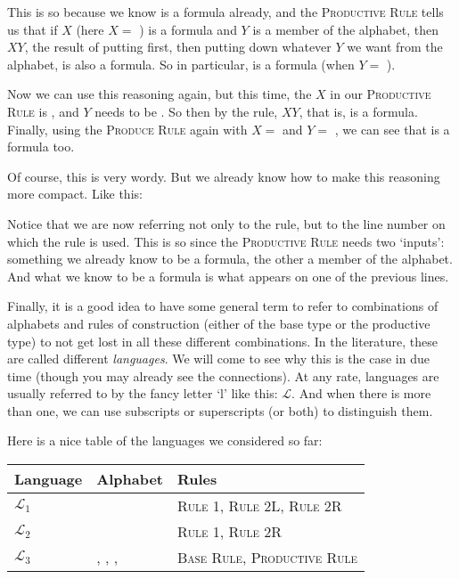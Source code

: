 This is so because we know \bbox{} is a formula already, and the \textsc{Productive Rule} tells us that if $X$ (here $X=$ \bbox) is a formula and $Y$ is a member of the alphabet, then $XY$, the result of putting \bbox{} first, then putting down whatever $Y$ we want from the alphabet, is also a formula. So in particular, \bbox\bcirc{} is a formula (when $Y=$ \bcirc).

Now we can use this reasoning again, but this time, the $X$ in our \textsc{Productive Rule} is \bbox\bcirc, and $Y$ needs to be \bbox. So then by the rule, $XY$, that is, \bbox\bcirc\bbox{} is a formula. Finally, using the \textsc{Produce Rule} again with $X=$ \bbox\bcirc\bbox{} and $Y=$ \btri{}, we can see that \bbox\bcirc\bbox\btri{} is a formula too. 

Of course, this is very wordy. But we already know how to make this reasoning more compact. Like this: 

\medskip
\begin{axiomatic}
\end{axiomatic}
\medskip

Notice that we are now referring not only to the rule, but to the line number on which the rule is used. This is so since the \textsc{Productive Rule} needs two `inputs': something we already know to be a formula, the other a member of the alphabet. And what we know to be a formula is what appears on one of the previous lines. 

Finally, it is a good idea to have some general term to refer to combinations of alphabets and rules of construction (either of the base type or the productive type) to not get lost in all these different combinations. In the literature, these are called different \textit{languages}. We will come to see why this is the case in due time (though you may already see the connections). At any rate, languages are usually referred to by the fancy letter `l' like this: $\mathcal{L}$. And when there is more than one, we can use subscripts or superscripts (or both) to distinguish them. 

Here is a nice table of the languages we considered so far: 

\begin{center}
\begin{tabular}{lll}
	\textbf{Language} & \textbf{Alphabet} & \textbf{Rules} \\\hline
	$\mathcal{L}_1$ & \bcirc & \textsc{Rule 1}, \textsc{Rule 2L}, \textsc{Rule 2R}\\
	$\mathcal{L}_2$ & \bcirc & \textsc{Rule 1}, \textsc{Rule 2R}\\
	$\mathcal{L}_3$ & \bcirc, \bbox, \btri, \bstar & \textsc{Base Rule}, \textsc{Productive Rule}
\end{tabular}
\end{center}

